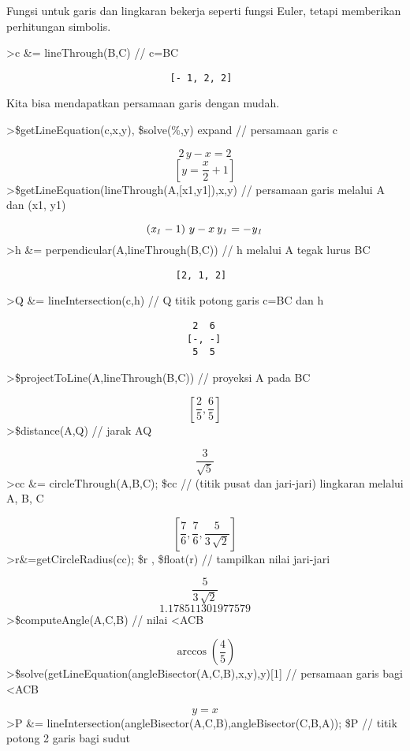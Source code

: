 \documentclass[
]{book}
\begin{document}
Fungsi untuk garis dan lingkaran bekerja seperti fungsi Euler, tetapi memberikan perhitungan simbolis.

\textgreater c \&= lineThrough(B,C) // c=BC

\begin{verbatim}
                             [- 1, 2, 2]
\end{verbatim}

Kita bisa mendapatkan persamaan garis dengan mudah.

\textgreater\$getLineEquation(c,x,y), \$solve(\%,y) \textbar{} expand // persamaan garis c

\[2\,y-x=2\] \[\left[ y=\frac{x}{2}+1 \right]\]\textgreater\$getLineEquation(lineThrough(A,{[}x1,y1{]}),x,y) // persamaan garis melalui A dan (x1, y1)

\[\left({\it x_1}-1\right)\,y-x\,{\it y_1}=-{\it y_1}\]\textgreater h \&= perpendicular(A,lineThrough(B,C)) // h melalui A tegak lurus BC

\begin{verbatim}
                              [2, 1, 2]
\end{verbatim}

\textgreater Q \&= lineIntersection(c,h) // Q titik potong garis c=BC dan h

\begin{verbatim}
                                 2  6
                                [-, -]
                                 5  5
\end{verbatim}

\textgreater\$projectToLine(A,lineThrough(B,C)) // proyeksi A pada BC

\[\left[ \frac{2}{5} , \frac{6}{5} \right]\]\textgreater\$distance(A,Q) // jarak AQ

\[\frac{3}{\sqrt{5}}\]\textgreater cc \&= circleThrough(A,B,C); \$cc // (titik pusat dan jari-jari) lingkaran melalui A, B, C

\[\left[ \frac{7}{6} , \frac{7}{6} , \frac{5}{3\,\sqrt{2}} \right]\]\textgreater r\&=getCircleRadius(cc); \$r , \$float(r) // tampilkan nilai jari-jari

\[\frac{5}{3\,\sqrt{2}}\] \[1.178511301977579\]\textgreater\$computeAngle(A,C,B) // nilai \textless ACB

\[\arccos \left(\frac{4}{5}\right)\]\textgreater\$solve(getLineEquation(angleBisector(A,C,B),x,y),y){[}1{]} // persamaan garis bagi \textless ACB

\[y=x\]\textgreater P \&= lineIntersection(angleBisector(A,C,B),angleBisector(C,B,A)); \$P // titik potong 2 garis bagi sudut
\end{document}
